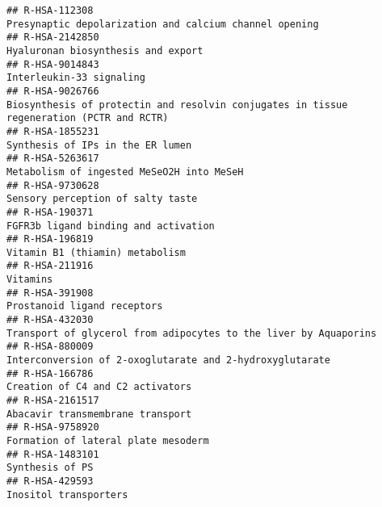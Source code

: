 \documentclass[
]{article}
\begin{document}
\begin{verbatim}
## R-HSA-112308                                                                                Presynaptic depolarization and calcium channel opening
## R-HSA-2142850                                                                                                   Hyaluronan biosynthesis and export
## R-HSA-9014843                                                                                                             Interleukin-33 signaling
## R-HSA-9026766                                             Biosynthesis of protectin and resolvin conjugates in tissue regeneration (PCTR and RCTR)
## R-HSA-1855231                                                                                                     Synthesis of IPs in the ER lumen
## R-HSA-5263617                                                                                            Metabolism of ingested MeSeO2H into MeSeH
## R-HSA-9730628                                                                                                    Sensory perception of salty taste
## R-HSA-190371                                                                                                  FGFR3b ligand binding and activation
## R-HSA-196819                                                                                                       Vitamin B1 (thiamin) metabolism
## R-HSA-211916                                                                                                                              Vitamins
## R-HSA-391908                                                                                                           Prostanoid ligand receptors
## R-HSA-432030                                                                      Transport of glycerol from adipocytes to the liver by Aquaporins
## R-HSA-880009                                                                              Interconversion of 2-oxoglutarate and 2-hydroxyglutarate
## R-HSA-166786                                                                                                      Creation of C4 and C2 activators
## R-HSA-2161517                                                                                                     Abacavir transmembrane transport
## R-HSA-9758920                                                                                                  Formation of lateral plate mesoderm
## R-HSA-1483101                                                                                                                      Synthesis of PS
## R-HSA-429593                                                                                                                 Inositol transporters

\end{verbatim}
\end{document}
